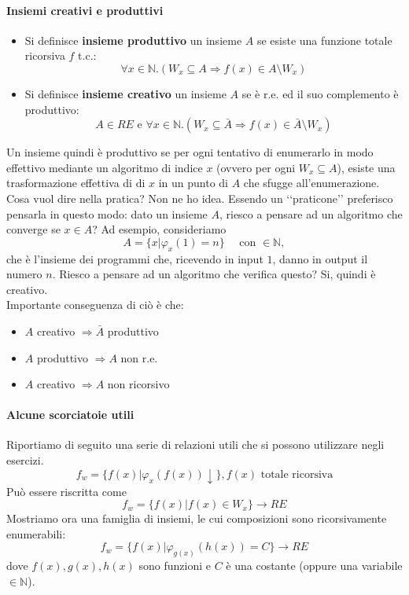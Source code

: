 \documentclass[a4paper,oneside]{scrbook}
\begin{document}
\paragraph{Insiemi creativi e produttivi}
\begin{itemize}
	\item Si definisce \textbf{insieme produttivo} un insieme $A$ se esiste una funzione totale ricorsiva $f$ t.c.:
	\begin{equation*}
		\forall x\in\mathbb{N}. (W_x \subseteq A \Rightarrow f(x)\in A \setminus W_x)
	\end{equation*}
	\item Si definisce \textbf{insieme creativo} un insieme $A$ se è r.e. ed il suo complemento è produttivo:
	\begin{equation*}
		A \in RE \text{ e } \forall x \in \mathbb{N}. (W_x \subseteq \bar{A} \Rightarrow f(x)\in\bar{A}\setminus W_x)
	\end{equation*}
\end{itemize}
Un insieme quindi è produttivo se per ogni tentativo di enumerarlo in modo effettivo mediante un algoritmo di indice $x$ (ovvero per ogni $W_x \subseteq A$),
esiste una trasformazione effettiva di di $x$ in un punto di $A$ che sfugge all'enumerazione. Cosa vuol dire nella pratica? Non ne ho idea.
Essendo un ‘‘praticone’’ preferisco pensarla in questo modo: dato un insieme $A$, riesco a pensare ad un algoritmo che converge se $x\in A$?
Ad esempio, consideriamo
$$A=\{x|\varphi_x(1)=n\} \quad \text{ con } \in\mathbb{N},$$
che è l'insieme dei programmi che, ricevendo in input $1$, danno in output il numero $n$. Riesco a pensare ad un algoritmo che verifica questo?
Si, quindi è creativo.\\
Importante conseguenza di ciò è che:
\begin{itemize}
	\item $A$ creativo $\Rightarrow \bar{A}$ produttivo
	\item $A$ produttivo $\Rightarrow A$ non r.e.
	\item $A$ creativo $\Rightarrow A$ non ricorsivo
\end{itemize}

\paragraph{Alcune scorciatoie utili}
Riportiamo di seguito una serie di relazioni utili che si possono utilizzare negli esercizi.
\begin{equation*}
    f_w=\{f(x)|\varphi_x(f(x))\downarrow\}, f(x) \text{ totale ricorsiva}
\end{equation*}
Può essere riscritta come
\begin{equation*}
    f_w=\{f(x)|f(x)\in W_x\} \rightarrow RE
\end{equation*}
\linebreak
Mostriamo ora una famiglia di insiemi, le cui composizioni sono ricorsivamente enumerabili:
\begin{equation*}
    f_w=\{f(x)|\varphi_{g(x)}(h(x))=C\} \rightarrow RE
\end{equation*}
dove $f(x),g(x),h(x)$ sono funzioni e $C$ è una costante (oppure una variabile $\in\mathbb{N}$).
\linebreak
\end{document}

